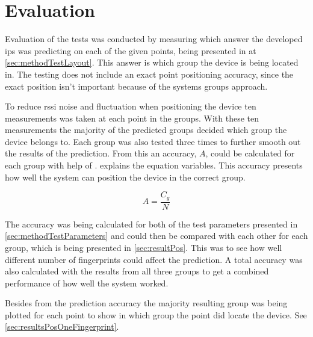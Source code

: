\section{Evaluation}\label{sec:methodEvaluation}
Evaluation of the tests was conducted by measuring which answer the developed \acrshort{ips} was predicting on each of the given points, being presented in  at \cref{sec:methodTestLayout}.
This answer is which group the device is being located in.
The testing does not include an exact point positioning accuracy, since the exact position isn't important because of the systems groups approach.

\bigskip

To reduce \acrshort{rssi} noise and fluctuation when positioning the device ten measurements was taken at each point in the groups.
With these ten measurements the majority of the predicted groups decided which group the device belongs to.
Each group was also tested three times to further smooth out the results of the prediction.
From this an accuracy, $A$, could be calculated for each group with help of .
 explains the equation variables.
This accuracy presents how well the system can position the device in the correct group.

\begin{equation}\label{eq:evaluation}	
	A = \frac{C_g}{N}
\end{equation}


The accuracy was being calculated for both of the test parameters presented in \cref{sec:methodTestParameters} and could then be compared with each other for each group, which is being presented in \cref{sec:resultPos}.
This was to see how well different number of fingerprints could affect the prediction.
A total accuracy was also calculated with the results from all three groups to get a combined performance of how well the system worked.

\bigskip

Besides from the prediction accuracy the majority resulting group was being plotted for each point to show in which group the point did locate the device.
See \cref{sec:resultsPosOneFingerprint}.
